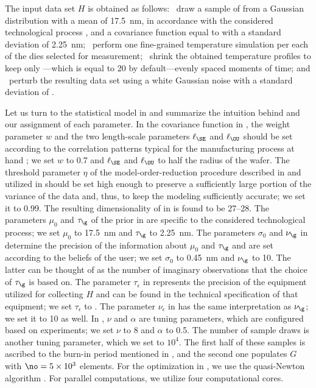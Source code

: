 The input data set $H$ is obtained as follows: \one~draw a sample of \g from a
Gaussian distribution with a mean of 17.5~nm, in accordance with the considered
technological process \cite{ptm}, and a covariance function equal to
 with a standard deviation of 2.25~nm; \two~perform
one fine-grained temperature simulation per each of the \hnd dies selected for
measurement; \three~shrink the obtained temperature profiles to keep only
\ns---which is equal to 20 by default---evenly spaced moments of time; and
\four~perturb the resulting data set using a white Gaussian noise with a
standard deviation of .

Let us turn to the statistical model in  and
summarize the intuition behind and our assignment of each parameter. In the
covariance function in , the weight parameter $w$ and
the two length-scale parameters $\ell_\SE$ and $\ell_\OU$ should be set
according to the correlation patterns typical for the manufacturing process at
hand \cite{chandrakasan2000, cheng2011}; we set $w$ to 0.7 and $\ell_\SE$ and
$\ell_\OU$ to half the radius of the wafer. The threshold parameter $\eta$ of
the model-order-reduction procedure described in  and
utilized in  should be set high enough to preserve a
sufficiently large portion of the variance of the data and, thus, to keep the
modeling sufficiently accurate; we set it to 0.99. The resulting dimensionality
\nz of \vz in  is found to be 27--28. The parameters
$\mu_0$ and $\tau_\g$ of the prior in  are specific to the
considered technological process; we set $\mu_0$ to 17.5~nm and $\tau_\g$ to
2.25~nm. The parameters $\sigma_0$ and $\nu_\g$ in 
determine the precision of the information about $\mu_0$ and $\tau_\g$ and are
set according to the beliefs of the user; we set $\sigma_0$ to 0.45~nm and
$\nu_\g$ to 10. The latter can be thought of as the number of imaginary
observations that the choice of $\tau_\g$ is based on. The parameter
$\tau_\epsilon$ in  represents the precision of the
equipment utilized for collecting $H$ and can be found in the technical
specification of that equipment; we set $\tau_\epsilon$ to . The
parameter $\nu_\epsilon$ in  has the same interpretation
as $\nu_\g$; we set it to 10 as well. In , $\nu$ and
$\alpha$ are tuning parameters, which are configured based on experiments; we
set $\nu$ to 8 and $\alpha$ to 0.5. The number of sample draws is another tuning
parameter, which we set to $10^4$. The first half of these samples is ascribed
to the burn-in period mentioned in , and the second
one populates $G$ with $\no = 5 \times 10^3$ elements. For the optimization in
, we use the quasi-Newton algorithm
\cite{press2007}. For parallel computations, we utilize four computational
cores.

